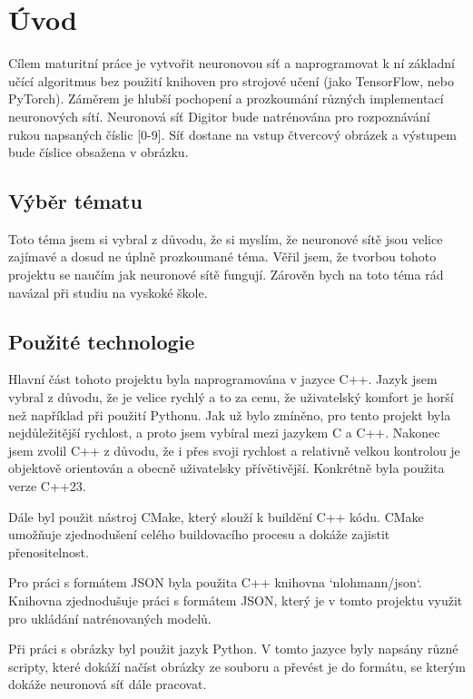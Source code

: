 \section{Úvod}
Cílem maturitní práce je vytvořit neuronovou síť a naprogramovat k ní základní učící algoritmus bez použití knihoven pro strojové učení (jako TensorFlow, nebo PyTorch).
Záměrem je hlubší pochopení a prozkoumání různých implementací neuronových sítí.
Neuronová síť Digitor bude natrénována pro rozpoznávání rukou napsaných číslic [0-9].
Síť dostane na vstup čtvercový obrázek a výstupem bude číslice obsažena v obrázku.

\subsection{Výběr tématu}
Toto téma jsem si vybral z důvodu, že si myslím, že neuronové sítě jsou velice zajímavé a dosud ne úplně prozkoumané téma.
Věřil jsem, že tvorbou tohoto projektu se naučím jak neuronové sítě fungují.
Zárověn bych na toto téma rád navázal při studiu na vyskoké škole.

\subsection{Použité technologie}
Hlavní část tohoto projektu byla naprogramována v jazyce C++.
Jazyk jsem vybral z důvodu, že je velice rychlý a to za cenu, že uživatelský komfort je horší než například při použití Pythonu.
Jak už bylo zmíněno, pro tento projekt byla nejdůležitější rychlost, a proto jsem vybíral mezi jazykem C a C++.
Nakonec jsem zvolil C++ z důvodu, že i přes svoji rychlost a relativně velkou kontrolou je objektově orientován a obecně uživatelsky přívětivější.
Konkrétně byla použita verze C++23.

Dále byl použit nástroj CMake, který slouží k buildění C++ kódu.
CMake umožňuje zjednodušení celého buildovacího procesu a dokáže zajistit přenositelnost.

Pro práci s formátem JSON byla použita C++ knihovna `nlohmann/json`\cite{json}.
Knihovna zjednodušuje práci s formátem JSON, který je v tomto projektu využit pro ukládání natrénovaných modelů.

Při práci s obrázky byl použit jazyk Python. V tomto jazyce byly napsány různé scripty,
které dokáží načíst obrázky ze souboru a převést je do formátu, se kterým dokáže neuronová síť dále pracovat.

